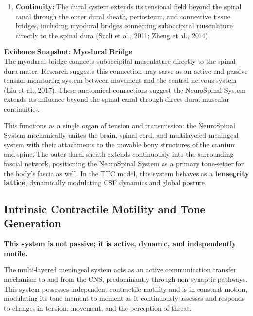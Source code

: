 \documentclass[11pt,letterpaper]{article}
\begin{document}
\begin{enumerate}
\item \textbf{Continuity:} The dural system extends its tensional field beyond the spinal canal through the outer dural sheath, periosteum, and connective tissue bridges, including myodural bridges connecting suboccipital musculature directly to the spinal dura (Scali et al., 2011; Zheng et al., 2014)
\end{enumerate}

\begin{evidencebox}
{\normalfont\bfseries Evidence Snapshot: Myodural Bridge}\\[3pt]
The myodural bridge connects suboccipital musculature directly to the spinal dura mater. Research suggests this connection may serve as an active and passive tension-monitoring system between movement and the central nervous system (Liu et al., 2017). These anatomical connections suggest the NeuroSpinal System extends its influence beyond the spinal canal through direct dural-muscular continuities.\par
\end{evidencebox}

This functions as a single organ of tension and transmission: the NeuroSpinal System mechanically unites the brain, spinal cord, and multilayered meningeal system with their attachments to the movable bony structures of the cranium and spine. The outer dural sheath extends continuously into the surrounding fascial network, positioning the NeuroSpinal System as a primary tone-setter for the body's fascia as well. In the TTC model, this system behaves as a \textbf{tensegrity lattice}, dynamically modulating CSF dynamics and global posture.


\subsection{Intrinsic Contractile Motility and Tone Generation}

\textbf{This system is not passive; it is active, dynamic, and independently motile.}


The multi-layered meningeal system acts as an active communication transfer mechanism to and from the CNS, predominantly through non-synaptic pathways. This system possesses independent contractile motility and is in constant motion, modulating its tone moment to moment as it continuously assesses and responds to changes in tension, movement, and the perception of threat.
\end{document}
